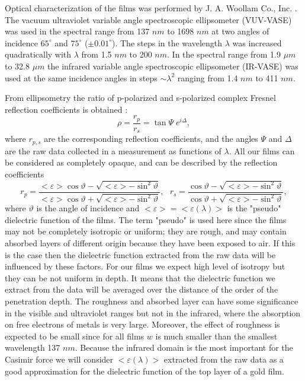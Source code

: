 \documentclass[prb]{revtex4}%
\begin{document}
\bigskip

Optical characterization of the films was performed by J. A. Woollam
Co., Inc. \cite{Woo}. The vacuum ultraviolet variable angle
spectroscopic ellipsometer (VUV-VASE) was used in the spectral range
from 137 $nm$ to 1698 $nm$ at two angles of incidence $65^{\circ}$
and $75^{\circ}$ ($\pm 0.01^{\circ}$). The steps in the wavelength
$\lambda$ was increased quadratically with $\lambda$ from 1.5 $nm$
to 200 $nm$. In the spectral range from 1.9 $\mu m$ to 32.8 $\mu m$
the infrared variable angle spectroscopic ellipsometer (IR-VASE) was
used at the same incidence angles in steps $\sim\lambda^2$ ranging
from 1.4 $nm$ to 411 $nm$.

From ellipsometry the ratio of p-polarized and s-polarized complex
Fresnel reflection coefficients is obtained \cite{Azz87,Tom99}:
%
\begin{equation}
\rho=\frac{r_p}{r_s}=\tan\Psi\;e^{i\Delta}, \label{Ellip}
\end{equation}
%
where $r_{p,s}$ are the corresponding reflection coefficients, and
the angles $\Psi$ and $\Delta$ are the raw data collected in a
measurement as functions of $\lambda$. All our films can be
considered as completely opaque, and can be described by the
reflection coefficients
%
\begin{equation}
r_p=\frac{<\varepsilon>\cos\vartheta-\sqrt{<\varepsilon>-\sin^2\vartheta}}
{<\varepsilon>\cos\vartheta+\sqrt{<\varepsilon>-\sin^2\vartheta}},\
\ \ r_s=\frac{\cos\vartheta-\sqrt{<\varepsilon>-\sin^2\vartheta}}
{\cos\vartheta+\sqrt{<\varepsilon>-\sin^2\vartheta}}, \label{refl}
\end{equation}
%
where $\vartheta$ is the angle of incidence and
$<\varepsilon>=<\varepsilon(\lambda)>$ is the "pseudo" dielectric
function of the films. The term "pseudo" is used here since the
films may not be completely isotropic or uniform; they are rough,
and may contain absorbed layers of different origin because they
have been exposed to air. If this is the case then the dielectric
function extracted from the raw data will be influenced by these
factors. For our films we expect high level of isotropy but they can
be not uniform in depth. It means that the dielectric function we
extract from the data will be averaged over the distance of the
order of the penetration depth. The roughness and absorbed layer can
have some significance in the visible and ultraviolet ranges but not
in the infrared, where the absorption on free electrons of metals is
very large. Moreover, the effect of roughness is expected to be
small since for all films $w$ is much smaller than the smallest
wavelength 137 $nm$. Because the infrared domain is the most
important for the Casimir force we will consider
$<\varepsilon(\lambda)>$ extracted from the raw data as a good
approximation for the dielectric function of the top layer of a gold
film.
\end{document}
